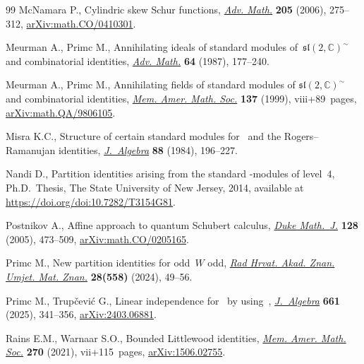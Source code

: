 \documentclass[pdftex]{sigma}
\numberwithin{equation}{section}
\begin{document}
\begin{thebibliography}{99}
McNamara P., Cylindric skew {S}chur functions,
 \href{https://doi.org/10.1016/j.aim.2005.07.011}{\textit{Adv. Math.}}
 \textbf{205} (2006), 275--312,
 \href{http://arxiv.org/abs/math.CO/0410301}{arXiv:math.CO/0410301}.

Meurman A., Primc M., Annihilating ideals of standard modules
 of~{$\mathfrak{sl}(2,\mathbb{C})^\sim$} and combinatorial identities,
 \href{https://doi.org/10.1016/0001-8708(87)90008-9}{\textit{Adv. Math.}}
 \textbf{64} (1987), 177--240.

Meurman A., Primc M., Annihilating fields of standard modules of
 {$\mathfrak{sl}(2,\mathbb{C})^\sim$} and combinatorial identities,
 \href{https://doi.org/10.1090/memo/0652}{\textit{Mem. Amer. Math. Soc.}}
 \textbf{137} (1999), viii+89~pages,
 \href{http://arxiv.org/abs/math.QA/9806105}{arXiv:math.QA/9806105}.

Misra K.C., Structure of certain standard modules for~ and the
 {R}ogers--{R}amanujan identities,
 \href{https://doi.org/10.1016/0021-8693(84)90098-X}{\textit{J.~Algebra}}
 \textbf{88} (1984), 196--227.

Nandi D., Partition identities arising from the standard -modules of
 level~$4$, Ph.D.~Thesis, {T}he State University of New Jersey, 2014,
 available at \url{https://doi.org/doi:10.7282/T3154G81}.

Postnikov A., Affine approach to quantum {S}chubert calculus,
 \href{https://doi.org/10.1215/S0012-7094-04-12832-5}{\textit{Duke Math.~J.}}
 \textbf{128} (2005), 473--509,
 \href{http://arxiv.org/abs/math.CO/0205165}{arXiv:math.CO/0205165}.

Primc M., New partition identities for odd~{$W$} odd,
 \href{https://doi.org/10.21857/9e31lhzl8m}{\textit{Rad Hrvat. Akad. Znan.
 Umjet. Mat. Znan.}} \textbf{28(558)} (2024), 49--56.

Primc M., Trup\v{c}evi\'c G., Linear independence for~ by
 using~,
 \href{https://doi.org/10.1016/j.jalgebra.2024.08.003}{\textit{J.~Algebra}}
 \textbf{661} (2025), 341--356,
 \href{http://arxiv.org/abs/2403.06881}{arXiv:2403.06881}.

Rains E.M., Warnaar S.O., Bounded {L}ittlewood identities,
 \href{https://doi.org/10.1090/memo/1317}{\textit{Mem. Amer. Math. Soc.}}
 \textbf{270} (2021), vii+115~pages,
 \href{http://arxiv.org/abs/1506.02755}{arXiv:1506.02755}.


\end{thebibliography}
\end{document}
